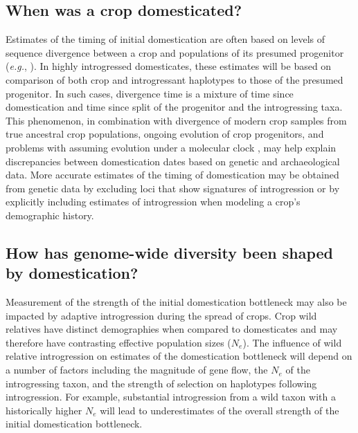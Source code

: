 \documentclass[11pt]{article}
\begin{document}
\subsection*{When was a crop domesticated?}
Estimates of the timing of initial domestication are often based on levels of sequence divergence between a crop and populations of its presumed progenitor (\emph{e.g.}, \cite{matsuoka2002single, molina2011molecular}).
In highly introgressed domesticates, these estimates will be based on comparison of both crop and introgressant haplotypes to those of the presumed progenitor.
In such cases, divergence time is a mixture of time since domestication and time since split of the progenitor and the introgressing taxa.
This phenomenon, in combination with divergence of modern crop samples from true ancestral crop populations, ongoing evolution of crop progenitors, and problems with assuming evolution under a molecular clock \cite{Zeder2006}, may help explain discrepancies between domestication dates based on genetic and archaeological data.
More accurate estimates of the timing of domestication may be obtained from genetic data by excluding loci that show signatures of introgression or by explicitly including estimates of introgression when modeling a crop's demographic history.

\subsection*{How has genome-wide diversity been shaped by domestication?}

Measurement of the strength of the initial domestication bottleneck may also be impacted by adaptive introgression during the spread of crops.
Crop wild relatives have distinct demographies when compared to domesticates and may therefore have contrasting effective population sizes ($N_e$).
The influence of wild relative introgression on estimates of the domestication bottleneck will depend on a number of factors including the magnitude of gene flow, the $N_e$ of the introgressing taxon, and the strength of selection on haplotypes following introgression.
For example, substantial introgression from a wild taxon with a historically higher $N_e$ will lead to underestimates of the overall strength of the initial domestication bottleneck.
\end{document}
